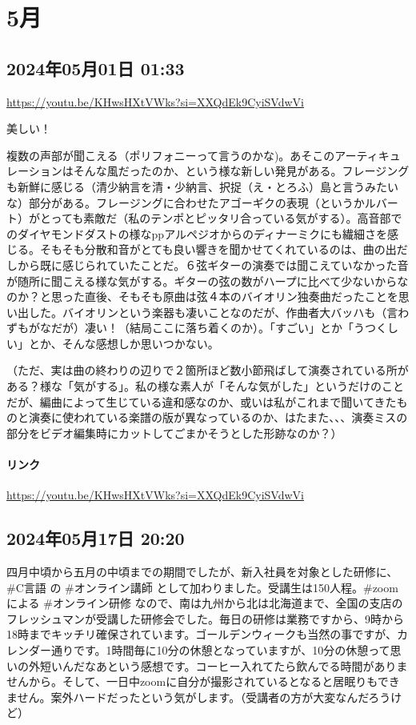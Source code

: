 \section{5月}

\subsection*{2024年05月01日 01:33}

\url{https://youtu.be/KHwsHXtVWks?si=XXQdEk9CyiSVdwVi}

美しい！

複数の声部が聞こえる（ポリフォニーって言うのかな)。あそこのアーティキュレーションはそんな風だったのか、という様な新しい発見がある。フレージングも新鮮に感じる（清少納言を清・少納言、択捉（え・とろふ）島と言うみたいな）部分がある。フレージングに合わせたアゴーギクの表現（というかルバート）がとっても素敵だ（私のテンポとピッタリ合っている気がする）。高音部でのダイヤモンドダストの様なppアルペジオからのディナーミクにも繊細さを感じる。そもそも分散和音がとても良い響きを聞かせてくれているのは、曲の出だしから既に感じられていたことだ。６弦ギターの演奏では聞こえていなかった音が随所に聞こえる様な気がする。ギターの弦の数がハープに比べて少ないからなのか？と思った直後、そもそも原曲は弦４本のバイオリン独奏曲だったことを思い出した。バイオリンという楽器も凄いことなのだが、作曲者大バッハも（言わずもがなだが）凄い！（結局ここに落ち着くのか）。「すごい」とか「うつくしい」とか、そんな感想しか思いつかない。

（ただ、実は曲の終わりの辺りで２箇所ほど数小節飛ばして演奏されている所がある？様な「気がする」。私の様な素人が「そんな気がした」というだけのことだが、編曲によって生じている違和感なのか、或いは私がこれまで聞いてきたものと演奏に使われている楽譜の版が異なっているのか、はたまた、、、演奏ミスの部分をビデオ編集時にカットしてごまかそうとした形跡なのか？）

\paragraph{リンク}
\url{https://youtu.be/KHwsHXtVWks?si=XXQdEk9CyiSVdwVi}

\subsection*{2024年05月17日 20:20}

四月中頃から五月の中頃までの期間でしたが、新入社員を対象とした研修に、\#C言語 の \#オンライン講師 として加わりました。受講生は150人程。\#zoom による \#オンライン研修 なので、南は九州から北は北海道まで、全国の支店のフレッシュマンが受講した研修会でした。毎日の研修は業務ですから、9時から18時までキッチリ確保されています。ゴールデンウィークも当然の事ですが、カレンダー通りです。1時間毎に10分の休憩となっていますが、10分の休憩って思いの外短いんだなあという感想です。コーヒー入れてたら飲んでる時間がありませんから。そして、一日中zoomに自分が撮影されているとなると居眠りもできません。案外ハードだったという気がします。（受講者の方が大変なんだろうけど）

